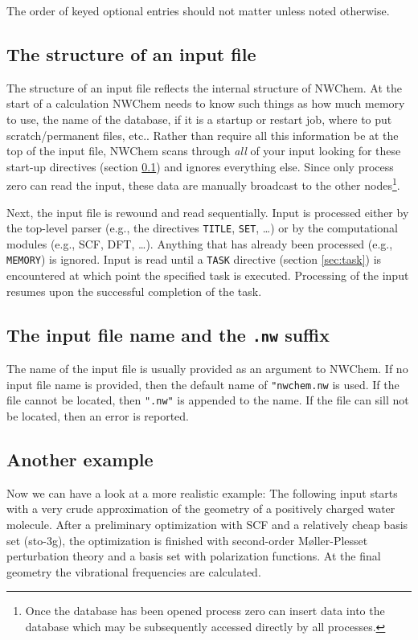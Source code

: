 The order of keyed optional entries should not matter unless noted
otherwise.

\subsection{The structure of an input file}
\label{sec:inputstructure}

The structure of an input file reflects the internal structure of
NWChem.  At the start of a calculation NWChem needs to know such
things as how much memory to use, the name of the database, if it is a
startup or restart job, where to put scratch/permanent files, etc..
Rather than require all this information be at the top of the input
file, NWChem scans through {\em all} of your input looking for these
start-up directives (section \ref{sec:inputstructure}) and ignores everything else.
Since only process zero can read the input, these data are manually
broadcast to the other nodes\footnote{Once the database has been opened
process zero can insert data into the database which may be
subsequently accessed directly by all processes.}.

Next, the input file is rewound and read sequentially.  Input is
processed either by the top-level parser (e.g., the directives
\verb+TITLE+, \verb+SET+, \ldots) or by the computational modules
(e.g., SCF, DFT, \ldots).  Anything that has already been processed
(e.g., \verb+MEMORY+) is ignored.  Input is read until a \verb+TASK+
directive (section \ref{sec:task}) is encountered at which point the specified
task is executed.  Processing of the input resumes upon the successful
completion of the task.

\subsection{The input file name and the {\tt .nw} suffix}
\label{sec:inputfilename}

The name of the input file is usually provided as an argument to
NWChem.  If no input file name is provided, then the default name of
\verb+"nwchem.nw+ is used.  If the file cannot be located, then
\verb+".nw"+ is appended to the name.  If the file can sill not be
located, then an error is reported.

\subsection{Another example}

Now we can have a look at a more realistic example: The following
input starts with a very crude approximation of the geometry of a
positively charged water molecule. After a preliminary optimization
with SCF and a relatively cheap basis set (sto-3g), the optimization
is finished with second-order M{\o}ller-Plesset perturbation theory and
a basis set with polarization functions. At the final geometry the
vibrational frequencies are calculated.

